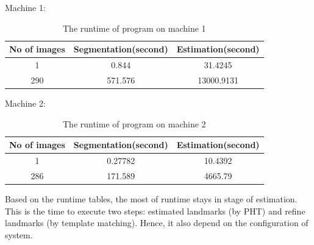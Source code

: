 Machine 1:
\begin{table}[h]
	\centering
	\begin{tabular}{|c|c|c|}
		\hline
		No of images & Segmentation(second) & Estimation(second) \\ \hline
		1 & 0.844 & 31.4245   \\ \hline
		290 & 571.576 & 13000.9131   \\ \hline
	\end{tabular}	
	\caption{The runtime of program on machine 1}		
	\label{table_runtime1}
\end{table}

Machine 2:
\begin{table}[h]
	\centering
	\begin{tabular}{|c|c|c|}
		\hline
		No of images & Segmentation(second) & Estimation(second) \\ \hline
		1 & 0.27782 & 10.4392   \\ \hline
		286 & 171.589 & 4665.79   \\ \hline
	\end{tabular}
	\caption{The runtime of program on machine 2}
	\label{table_runtime2}
\end{table}
Based on the runtime tables, the most of runtime stays in stage of estimation. This is the time to execute two steps: estimated landmarks (by PHT) and refine landmarks (by template matching). Hence, it also depend on the configuration of system.
